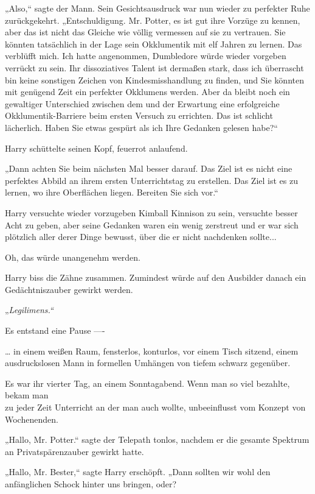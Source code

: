 {„Also,“ sagte der Mann. Sein Gesichtsausdruck war nun wieder zu perfekter Ruhe zurückgekehrt. „Entschuldigung. Mr. Potter, es ist gut ihre Vorzüge zu kennen, aber das ist nicht das Gleiche wie völlig vermessen auf sie zu vertrauen. Sie könnten tatsächlich in der Lage sein Okklumentik mit elf Jahren zu lernen. Das verblüfft mich. Ich hatte angenommen, Dumbledore würde wieder vorgeben verrückt zu sein. Ihr dissoziatives Talent ist dermaßen stark, dass ich überrascht bin keine sonstigen Zeichen von Kindesmisshandlung zu finden, und Sie könnten mit genügend Zeit ein perfekter Okklumens werden. Aber da bleibt noch ein gewaltiger Unterschied zwischen dem und der Erwartung eine erfolgreiche Okklumentik-Barriere beim ersten Versuch zu errichten. Das ist schlicht lächerlich. Haben Sie etwas gespürt als ich Ihre Gedanken gelesen habe?“

Harry schüttelte seinen Kopf, feuerrot anlaufend.

„Dann achten Sie beim nächsten Mal besser darauf. Das Ziel ist es nicht eine perfektes Abbild an ihrem ersten Unterrichtstag zu erstellen. Das Ziel ist es zu lernen, wo ihre Oberflächen liegen. Bereiten Sie sich vor.“

Harry versuchte wieder vorzugeben Kimball Kinnison zu sein, versuchte besser Acht zu geben, aber seine Gedanken waren ein wenig zerstreut und er war sich plötzlich aller derer Dinge bewusst, über die er nicht nachdenken sollte...

Oh, das würde unangenehm werden.

Harry biss die Zähne zusammen. Zumindest würde auf den Ausbilder danach ein Gedächtniszauber gewirkt werden.

„\emph{Legilimens.“}

Es entstand eine Pause ----

… in einem weißen Raum, fensterlos, konturlos, vor einem Tisch sitzend, einem ausdruckslosen Mann in formellen Umhängen von tiefem schwarz gegenüber.

Es war ihr vierter Tag, an einem Sonntagabend. Wenn man so viel bezahlte, bekam man\\ zu jeder Zeit Unterricht an der man auch wollte, unbeeinflusst vom Konzept von Wochenenden.

„Hallo, Mr. Potter.“ sagte der Telepath tonlos, nachdem er die gesamte Spektrum an Privatspärenzauber gewirkt hatte.

„Hallo, Mr. Bester,“ sagte Harry erschöpft. „Dann sollten wir wohl den anfänglichen Schock hinter uns bringen, oder?

}
